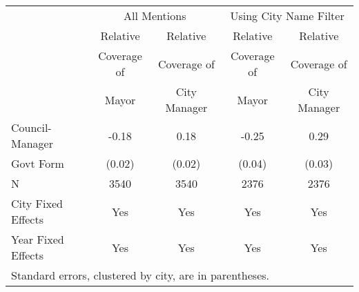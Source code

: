 \documentclass[11pt]{article}
\begin{document}
\begin{table}[t] 
\centering 
\normalsize 
\begin{tabular}{lcccc} 
\toprule \toprule 
 & \multicolumn{2}{c}{All Mentions} & \multicolumn{2}{c}{Using City Name Filter} \\[2mm] 
 & Relative    & Relative     & Relative    & Relative     \\ 
 & Coverage of & Coverage of  & Coverage of & Coverage of  \\ 
 & Mayor       & City Manager & Mayor       & City Manager \\ 
\midrule 
 Council-Manager  &  -0.18  &  0.18  &  -0.25  &  0.29  \\ 
 \quad Govt Form  & (0.02) & (0.02) & (0.04) & (0.03) \\[2mm] 
 N                &  3540  &  3540  &  2376  &  2376  \\[2mm] 
 City Fixed Effects & Yes & Yes & Yes & Yes \\
 Year Fixed Effects & Yes & Yes & Yes & Yes \\
\bottomrule \bottomrule 
\multicolumn{5}{p{.80\textwidth}}{Standard errors, clustered by city, are in parentheses.} \\ 
\end{tabular} 
\end{table} 
\end{document}
